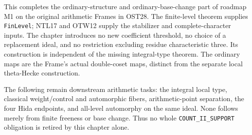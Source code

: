 This completes the ordinary-structure and ordinary-base-change
part of roadmap M1 on the original arithmetic Frames in OST28.
The finite-level theorem supplies \texttt{FinLevel}; NTL17
and OTW12 supply the stabilizer and complete-character inputs.
The chapter introduces no new coefficient threshold, no choice
of a replacement ideal, and no restriction excluding residue
characteristic three.  Its construction is independent of the
missing integral-type theorem.  The ordinary maps are the
Frame's actual double-coset maps, distinct from the separate
local theta-Hecke construction.

The following remain downstream arithmetic tasks: the
integral local type, classical weight/control and automorphic
fibers, arithmetic-point separation, the four Hida endpoints,
and all-level automorphy on the same ideal.  None follows merely
from finite freeness or base change.  Thus no whole
\texttt{COUNT\_II\_SUPPORT} obligation is retired by this
chapter alone.
